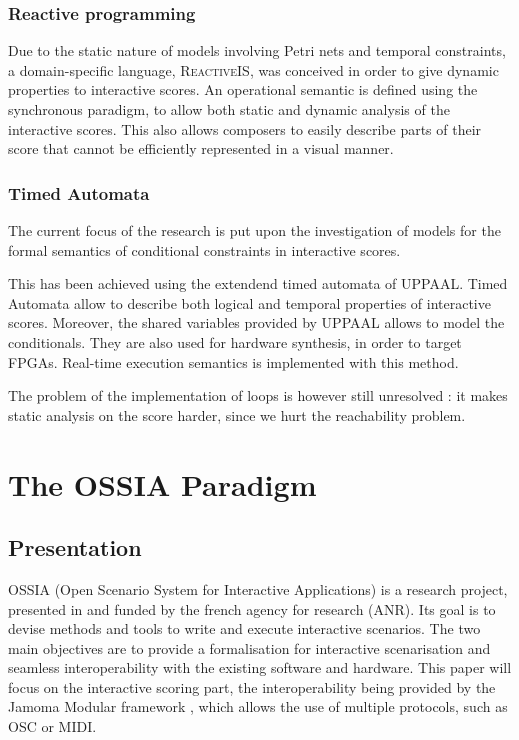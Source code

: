 \documentclass{article}
\begin{document}
	\subsubsection{Reactive programming}
	Due to the static nature of models involving Petri nets and temporal constraints, a domain-specific language, \textsc{ReactiveIS}\cite{ariasexecuting}, was conceived in order to give dynamic properties to interactive scores. 
	An operational semantic is defined using the synchronous paradigm, to allow both static and dynamic analysis of the interactive scores.
	This also allows composers to easily describe parts of their score that cannot be efficiently represented in a visual manner.

	\subsubsection{Timed Automata}
	The current focus of the research is put upon the investigation of models for the formal semantics of conditional constraints in interactive scores.
	
	This has been achieved using the extendend timed automata of \textsc{UPPAAL}. Timed Automata allow to describe both logical and temporal properties of interactive scores. Moreover, the shared variables provided by \textsc{UPPAAL} allows to model the conditionals.
	They are also used for hardware synthesis, in order to target \acp{FPGA}\cite{arias2015exploiting}. 
	Real-time execution semantics is implemented with this method.
	
	The problem of the implementation of loops is however still unresolved : it makes static analysis on the score harder, since we hurt the reachability problem.
	
	\section{The OSSIA Paradigm}
	\subsection{Presentation}
	OSSIA (Open Scenario System for Interactive Applications) is a research project, presented in \cite{hogue2014ossia} and funded by the french agency for research (ANR).
	Its goal is to devise methods and tools to write and execute interactive scenarios.
	The two main objectives are to provide a formalisation for interactive scenarisation and seamless interoperability with the existing software and hardware.
	This paper will focus on the interactive scoring part, the interoperability being provided by the Jamoma Modular framework \cite{Jamoma-JIM11}, which allows the use of multiple protocols, such as OSC or MIDI.
	
\end{document}
